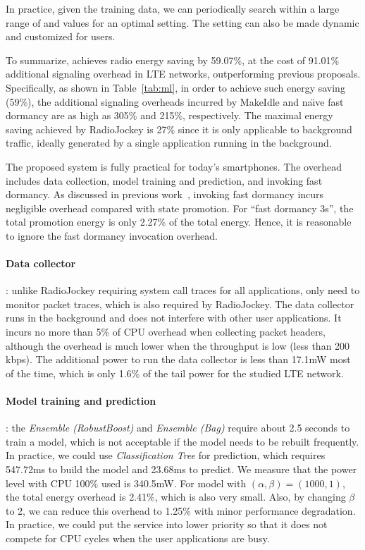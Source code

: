 In practice, given the training data, we can periodically search within a large range of \BT and \SBT values for an optimal setting. The setting can also be made dynamic and customized for users.

To summarize, \NAME achieves radio energy saving by 59.07\%, at the cost of 91.01\% additional signaling overhead in LTE networks, outperforming previous proposals. Specifically, as shown in Table~\ref{tab:ml}, in order to achieve such energy saving (59\%), the additional signaling overheads incurred by MakeIdle and na\"{\i}ve fast dormancy are as high as 305\% and 215\%, respectively. The maximal energy saving achieved by RadioJockey is 27\% since it is only applicable to background traffic, ideally generated by a single application running in the background.


The proposed \NAME system is fully practical for today's smartphones. The overhead includes data collection, model training and prediction, and invoking fast dormancy. As discussed in previous work~\cite{radiojockey}, invoking fast dormancy incurs negligible overhead compared with state promotion. For ``fast dormancy 3s'', the total promotion energy is only 2.27\% of the total energy. Hence, it is reasonable to ignore the fast dormancy invocation overhead.

\paragraph{Data collector}: unlike RadioJockey requiring system call traces for all applications, \NAME only need to monitor packet traces, which is also required by RadioJockey. The data collector runs in the background and does not interfere with other user applications. It incurs no more than 5\% of CPU overhead when collecting packet headers, although the overhead is much lower when the throughput is low (\eg less than 200 kbps). The additional power to run the data collector is less than 17.1mW most of the time, which is only 1.6\% of the tail power for the studied LTE network.

\paragraph{Model training and prediction}: the {\em Ensemble (RobustBoost)} and {\em Ensemble (Bag)} require about 2.5 seconds to train a model, which is not acceptable if the model needs to be rebuilt frequently. In practice, we could use {\em Classification Tree} for prediction, which requires 547.72ms to build the model and 23.68ms to predict. We measure that the power level with CPU 100\% used is 340.5mW. For \MostRecent model with $(\alpha, \beta) = (1000, 1)$, the total energy overhead is 2.41\%, which is also very small. Also, by changing $\beta$ to 2, we can reduce this overhead to 1.25\% with minor performance degradation. In practice, we could put the \NAME service into lower priority so that it does not compete for CPU cycles when the user applications are busy.

